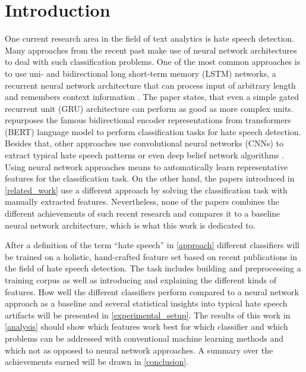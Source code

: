 \section{Introduction}

One current research area in the field of text analytics is hate speech detection. Many approaches from the recent past make use of neural network architectures to deal with such classification problems. One of the most common approaches is to use uni- and bidirectional long short-term memory (LSTM) networks, a recurrent neural network architecture that can process input of arbitrary length and remembers context information \cite{Dorris2020, Syam2019, Saksesi2018}. The paper \cite{Founta2019} states, that even a simple gated recurrent unit (GRU) architecture can perform as good as more complex units. \cite{Saleh2020} repurposes the famous bidirectional encoder representations from transformers (BERT) language model to perform clas\-si\-fi\-ca\-tion tasks for hate speech detection. Besides that, other approaches use con\-vo\-lu\-tional neural networks (CNNs) to extract typical hate speech patterns \cite{Badjatiya2017, Roy2020, Kapil2020} or even deep belief network algorithms \cite{Muhammad2020}. Using neural network approaches means to automatically learn representative features for the classification task. On the other hand, the papers introduced in \autoref{related_work} use a different approach by solving the classification task with manually extracted features. Nevertheless, none of the papers combines the different achievements of such recent research and compares it to a baseline neural network architecture, which is what this work is dedicated to.

After a definition of the term \enquote{hate speech} in \autoref{approach} different classifiers will be trained on a holistic, hand-crafted feature set based on recent pub\-li\-ca\-tions in the field of hate speech detection. The task includes building and pre\-pro\-cess\-ing a training corpus as well as introducing and explaining the different kinds of features. How well the different classifiers perform compared to a neural network approach as a baseline and several statistical insights into typical hate speech artifacts will be presented in \autoref{experimental_setup}. The results of this work in \autoref{analysis} should show which features work best for which classifier and which problems can be addressed with conventional machine learning methods and which not as opposed to neural network approaches. A summary over the achievements earned will be drawn in \autoref{conclusion}.
